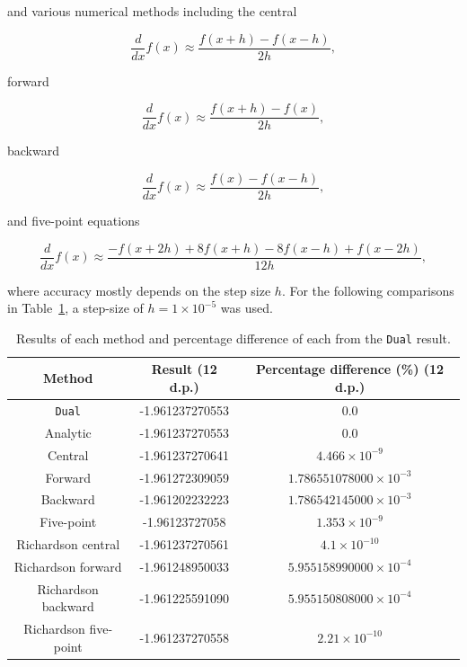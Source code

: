 \documentclass[11pt,a4paper]{article}
\begin{document}
and various numerical methods including the central \citep{numericaldiff}

\begin{equation}
    \frac{d}{dx} f(x) \approx \frac{f(x+h) - f(x-h)}{2h},
\end{equation}

forward \citep{numericaldiff}

\begin{equation}
    \frac{d}{dx} f(x) \approx \frac{f(x+h) - f(x)}{2h},
\end{equation}

backward \citep{numericaldiff}

\begin{equation}
    \frac{d}{dx} f(x) \approx \frac{f(x) - f(x-h)}{2h},
\end{equation}

and five-point \citep{sauer_numerical_2012} equations 

\begin{equation}
    \frac{d}{dx} f(x) \approx \frac{-f(x+2h) + 8 f(x+h) - 8 f(x-h) + f(x-2h)}{12h},
\end{equation}

where accuracy mostly depends on the step size $h$. For the following comparisons in Table~\ref{tab:diffs}, a step-size of $h=1 \times 10^{-5}$ was used.

\begin{table}
    \centering
    \begin{tabular}{c|c|c}
        Method & Result (12 d.p.) & Percentage difference (\%) (12 d.p.)\\
        \hline
        \texttt{Dual} & -1.961237270553 & $0.0$\\
        Analytic & -1.961237270553 & $0.0$\\
        \hline
        Central & -1.961237270641 & $4.466\times 10^{-9}$\\
        Forward & -1.961272309059 & $1.786551078000\times 10^{-3}$\\
        Backward & -1.961202232223 & $1.786542145000 \times 10^{-3}$\\
        Five-point & -1.96123727058 & $1.353\times 10^{-9}$\\
        \hline
        Richardson central & -1.961237270561 & $4.1\times 10^{-10}$\\
        Richardson forward & -1.961248950033 & $5.955158990000\times 10^{-4}$\\
        Richardson backward & -1.961225591090 & $5.955150808000\times 10^{-4}$\\
        Richardson five-point & -1.961237270558 & $2.21\times 10^{-10}$
    \end{tabular}
    \caption{Results of each method and percentage difference of each from the \texttt{Dual} result.}
    \label{tab:diffs}
\end{table}
\end{document}
